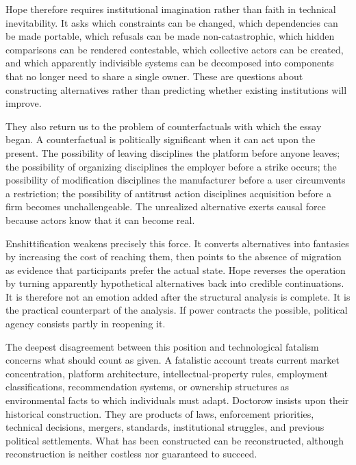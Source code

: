 \documentclass[11pt]{article}
\begin{document}
Hope therefore requires institutional imagination rather than faith in technical inevitability. It asks which constraints can be changed, which dependencies can be made portable, which refusals can be made non-catastrophic, which hidden comparisons can be rendered contestable, which collective actors can be created, and which apparently indivisible systems can be decomposed into components that no longer need to share a single owner. These are questions about constructing alternatives rather than predicting whether existing institutions will improve.

They also return us to the problem of counterfactuals with which the essay began. A counterfactual is politically significant when it can act upon the present. The possibility of leaving disciplines the platform before anyone leaves; the possibility of organizing disciplines the employer before a strike occurs; the possibility of modification disciplines the manufacturer before a user circumvents a restriction; the possibility of antitrust action disciplines acquisition before a firm becomes unchallengeable. The unrealized alternative exerts causal force because actors know that it can become real.

Enshittification weakens precisely this force. It converts alternatives into fantasies by increasing the cost of reaching them, then points to the absence of migration as evidence that participants prefer the actual state. Hope reverses the operation by turning apparently hypothetical alternatives back into credible continuations. It is therefore not an emotion added after the structural analysis is complete. It is the practical counterpart of the analysis. If power contracts the possible, political agency consists partly in reopening it.

The deepest disagreement between this position and technological fatalism concerns what should count as given. A fatalistic account treats current market concentration, platform architecture, intellectual-property rules, employment classifications, recommendation systems, or ownership structures as environmental facts to which individuals must adapt. Doctorow insists upon their historical construction. They are products of laws, enforcement priorities, technical decisions, mergers, standards, institutional struggles, and previous political settlements. What has been constructed can be reconstructed, although reconstruction is neither costless nor guaranteed to succeed.
\end{document}
